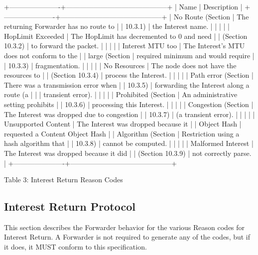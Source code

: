 \documentclass[12pt]{report}
\begin{document}
+----------------------+--------------------------------------------+
| Name                 | Description                                |
+----------------------+--------------------------------------------+
| No Route (Section    | The returning Forwarder has no route to    |
| 10.3.1)              | the Interest name.                         |
|                      |                                            |
| HopLimit Exceeded    | The HopLimit has decremented to 0 and need |
| (Section 10.3.2)     | to forward the packet.                     |
|                      |                                            |
| Interest MTU too     | The Interest's MTU does not conform to the |
| large (Section       | required minimum and would require         |
| 10.3.3)              | fragmentation.                             |
|                      |                                            |
| No Resources         | The node does not have the resources to    |
| (Section 10.3.4)     | process the Interest.                      |
|                      |                                            |
| Path error (Section  | There was a transmission error when        |
| 10.3.5)              | forwarding the Interest along a route (a   |
|                      | transient error).                          |
|                      |                                            |
| Prohibited (Section  | An administrative setting prohibits        |
| 10.3.6)              | processing this Interest.                  |
|                      |                                            |
| Congestion (Section  | The Interest was dropped due to congestion |
| 10.3.7)              | (a transient error).                       |
|                      |                                            |
| Unsupported Content  | The Interest was dropped because it        |
| Object Hash          | requested a Content Object Hash            |
| Algorithm (Section   | Restriction using a hash algorithm that    |
| 10.3.8)              | cannot be computed.                        |
|                      |                                            |
| Malformed Interest   | The Interest was dropped because it did    |
| (Section 10.3.9)     | not correctly parse.                       |
+----------------------+--------------------------------------------+

                Table 3: Interest Return Reason Codes

\subsection{Interest Return Protocol}
This section describes the Forwarder behavior for the various Reason
codes for Interest Return.  A Forwarder is not required to generate
any of the codes, but if it does, it MUST conform to this
specification.
\end{document}
